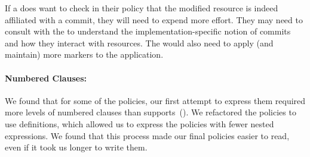 If a \ce{} does want to check in their \syslang{} policy that the modified resource is indeed
affiliated with a commit, they will need to expend more effort.
%
They may need to consult with the \dev{} to understand 
the implementation-specific notion of commits and how they interact with resources.
%
The \dev{} would also need to apply (and maintain) more markers to the application.

\paragraph{Numbered Clauses:} We found that for some of the policies, 
our first attempt to express them required more levels of numbered clauses than \sys{} supports~().
%
We refactored the policies to use definitions, 
which allowed us to express the policies with fewer nested expressions.
%
We found that this process made our final policies easier to read,
even if it took us longer to write them.